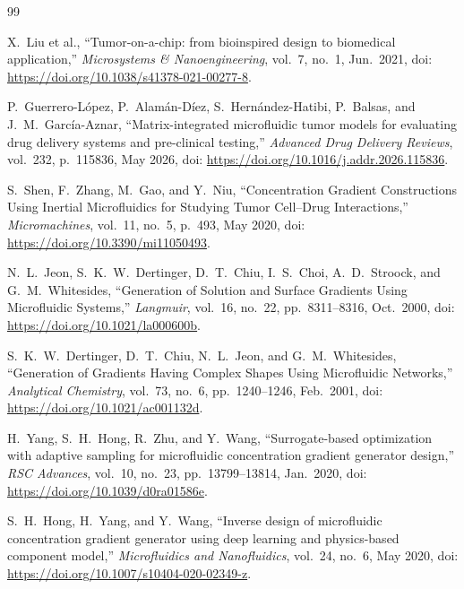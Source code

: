 \documentclass[12pt]{article}
\begin{document}
\begin{thebibliography}{99}

X.~Liu et al., ``Tumor-on-a-chip: from bioinspired design to biomedical application,'' \textit{Microsystems \& Nanoengineering}, vol.~7, no.~1, Jun.\ 2021, doi: \url{https://doi.org/10.1038/s41378-021-00277-8}.

P.~Guerrero-L\'opez, P.~Alam\'an-D\'iez, S.~Hern\'andez-Hatibi, P.~Balsas, and J.~M.~Garc\'ia-Aznar, ``Matrix-integrated microfluidic tumor models for evaluating drug delivery systems and pre-clinical testing,'' \textit{Advanced Drug Delivery Reviews}, vol.~232, p.~115836, May 2026, doi: \url{https://doi.org/10.1016/j.addr.2026.115836}.

S.~Shen, F.~Zhang, M.~Gao, and Y.~Niu, ``Concentration Gradient Constructions Using Inertial Microfluidics for Studying Tumor Cell--Drug Interactions,'' \textit{Micromachines}, vol.~11, no.~5, p.~493, May 2020, doi: \url{https://doi.org/10.3390/mi11050493}.

N.~L.~Jeon, S.~K.~W.~Dertinger, D.~T.~Chiu, I.~S.~Choi, A.~D.~Stroock, and G.~M.~Whitesides, ``Generation of Solution and Surface Gradients Using Microfluidic Systems,'' \textit{Langmuir}, vol.~16, no.~22, pp.~8311--8316, Oct.\ 2000, doi: \url{https://doi.org/10.1021/la000600b}.

S.~K.~W.~Dertinger, D.~T.~Chiu, N.~L.~Jeon, and G.~M.~Whitesides, ``Generation of Gradients Having Complex Shapes Using Microfluidic Networks,'' \textit{Analytical Chemistry}, vol.~73, no.~6, pp.~1240--1246, Feb.\ 2001, doi: \url{https://doi.org/10.1021/ac001132d}.

H.~Yang, S.~H.~Hong, R.~Zhu, and Y.~Wang, ``Surrogate-based optimization with adaptive sampling for microfluidic concentration gradient generator design,'' \textit{RSC Advances}, vol.~10, no.~23, pp.~13799--13814, Jan.\ 2020, doi: \url{https://doi.org/10.1039/d0ra01586e}.

S.~H.~Hong, H.~Yang, and Y.~Wang, ``Inverse design of microfluidic concentration gradient generator using deep learning and physics-based component model,'' \textit{Microfluidics and Nanofluidics}, vol.~24, no.~6, May 2020, doi: \url{https://doi.org/10.1007/s10404-020-02349-z}.


\end{thebibliography}
\end{document}
